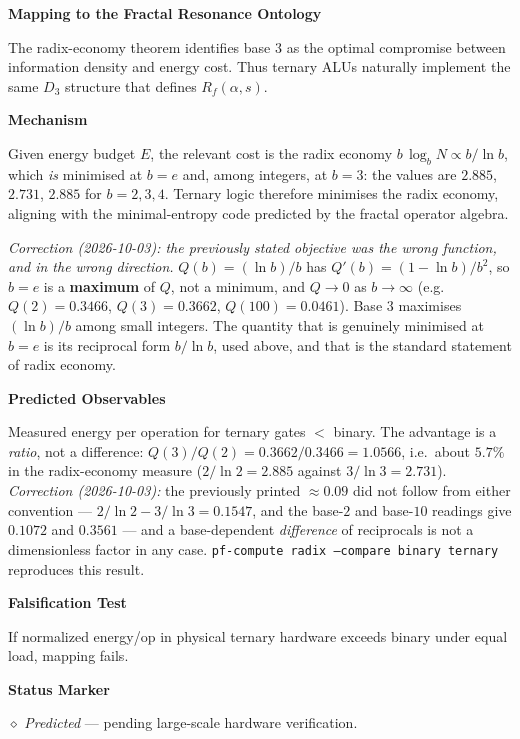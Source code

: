 \textbf{Mapping to the Fractal Resonance Ontology}

The radix-economy theorem identifies base 3 as the optimal compromise between information density and energy cost.
Thus ternary ALUs naturally implement the same $D_3$ structure that defines $R_f(\alpha,s)$.

\textbf{Mechanism}

Given energy budget $E$, the relevant cost is the radix economy
$b\,\log_b N \propto b/\ln b$, which \emph{is} minimised at $b = e$ and, among
integers, at $b = 3$: the values are $2.885$, $\mathbf{2.731}$, $2.885$ for
$b = 2,3,4$. Ternary logic therefore minimises the radix economy, aligning with
the minimal-entropy code predicted by the fractal operator algebra.

\emph{Correction (2026-10-03): the previously stated objective was the wrong
function, and in the wrong direction.} $Q(b) = (\ln b)/b$ has
$Q'(b) = (1 - \ln b)/b^2$, so $b = e$ is a \textbf{maximum} of $Q$, not a
minimum, and $Q \to 0$ as $b \to \infty$ (e.g.\ $Q(2) = 0.3466$,
$Q(3) = 0.3662$, $Q(100) = 0.0461$). Base $3$ maximises $(\ln b)/b$ among small
integers. The quantity that is genuinely minimised at $b = e$ is its reciprocal
form $b/\ln b$, used above, and that is the standard statement of radix
economy.

\textbf{Predicted Observables}

Measured energy per operation for ternary gates $<$ binary. The advantage is a
\emph{ratio}, not a difference: $Q(3)/Q(2) = 0.3662/0.3466 = 1.0566$, i.e.\
about $5.7\%$ in the radix-economy measure
($2/\ln 2 = 2.885$ against $3/\ln 3 = 2.731$).
\emph{Correction (2026-10-03):} the previously printed $\approx 0.09$ did not
follow from either convention --- $2/\ln 2 - 3/\ln 3 = 0.1547$, and the
base-$2$ and base-$10$ readings give $0.1072$ and $0.3561$ --- and a
base-dependent \emph{difference} of reciprocals is not a dimensionless factor in
any case.
\texttt{pf-compute radix --compare binary ternary} reproduces this result.

\textbf{Falsification Test}

If normalized energy/op in physical ternary hardware exceeds binary under equal load, mapping fails.

\textbf{Status Marker}

$\diamond$ \textit{Predicted} --- pending large-scale hardware verification.

